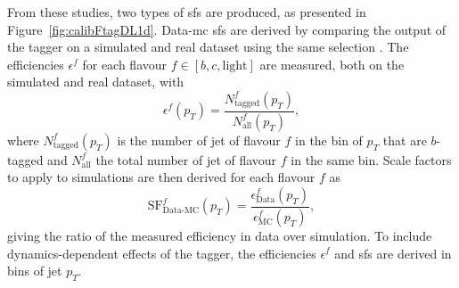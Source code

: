 From these studies, two types of \glspl{sf} are produced, as presented in Figure~\ref{fig:calibFtagDL1d}. Data-\gls{mc} \glspl{sf} are derived by comparing the output of the tagger on a simulated and real dataset using the same selection \cite{Aad:2019aic, ATLAS-CONF-2018-045, ATLAS-CONF-2018-006, cjettaggingCalib}. The efficiencies $\epsilon^f$ for each flavour $f \in [b, c, \textrm{light}]$ are measured, both on the simulated and real dataset, with \[\epsilon^f(p_T) = \frac{N^f_{\textrm{tagged}}(p_T)}{N^f_{\textrm{all}}(p_T)},\] where $N^f_{\textrm{tagged}}(p_T)$ is the number of jet of flavour $f$ in the bin of $p_T$ that are $b$-tagged and $N^f_{\textrm{all}}$ the total number of jet of flavour $f$ in the same bin. Scale factors to apply to simulations are then derived for each flavour $f$ as \[\textrm{SF}^f_{\textrm{Data-MC}}(p_T) = \frac{\epsilon^f_{\textrm{Data}}(p_T)}{\epsilon^f_{\textrm{MC}}(p_T)},\] giving the ratio of the measured efficiency in data over simulation. To include dynamics-dependent effects of the tagger, the efficiencies $\epsilon^f$ and \glspl{sf} are derived in bins of jet $p_T$.

